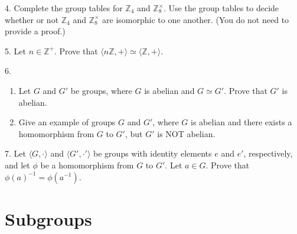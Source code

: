 \documentclass[10pt,]{book}
\theoremstyle{plain}
\theoremstyle{definition}
\theoremstyle{definition}
\theoremstyle{definition}
\theoremstyle{definition}
\numberwithin{equation}{section}
\def\Z{\mathbb{Z}}
\begin{document}
\begin{exerciselist}
\begin{enumerate}[label=(\alph*)]
\end{enumerate}
%
\par\smallskip
\item[4.]\hypertarget{exercise-24}{}Complete the group tables for \(\Z_4\) and \(\Z_8^{\times}\). Use the group tables to decide whether or not \(\Z_4\) and \(\Z_8^{\times}\) are isomorphic to one another. (You do not need to provide a proof.)%
\par\smallskip
\item[5.]\hypertarget{exercise-25}{}Let \(n\in \Z^+\). Prove that \(\langle n\Z,+\rangle  \simeq \langle \Z,+\rangle\).%
\par\smallskip
\item[6.]\hypertarget{exercise-26}{}\leavevmode%
\begin{enumerate}[label=(\alph*)]
\item\hypertarget{li-176}{}Let \(G\) and \(G'\) be groups, where \(G\) is abelian and  \(G\simeq G'\). Prove that \(G'\) is abelian.%
\item\hypertarget{li-177}{}Give an example of groups \(G\) and \(G'\), where \(G\) is abelian and there exists a homomorphism from \(G\) to \(G'\), but \(G'\) is NOT abelian.%
\end{enumerate}
\par\smallskip
\item[7.]\hypertarget{exercise-27}{}Let \(\langle G,\cdot\rangle\) and \(\langle G',\cdot'\rangle\) be groups with identity elements \(e\) and \(e'\), respectively, and let \(\phi\) be a homomorphism from \(G\) to \(G'\). Let \(a\in G\). Prove that \(\phi(a)^{-1}=\phi(a^{-1})\).%
\par\smallskip
\end{exerciselist}
\typeout{************************************************}
\typeout{************************************************}
\chapter[{Subgroups}]{Subgroups}\label{subgps}
\typeout{************************************************}
\typeout{************************************************}
\end{document}
